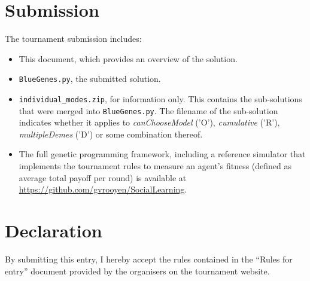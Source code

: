 \documentclass[a4paper,10pt]{article}
\begin{document}
\section{Submission}
The tournament submission includes:
\begin{itemize}
 \item This document, which provides an overview of the solution.
 \item \texttt{BlueGenes.py}, the submitted solution.
 \item \texttt{individual\_modes.zip}, for information only. This contains the sub-solutions that were merged into
   \texttt{BlueGenes.py}. The filename of the sub-solution indicates whether it applies to \emph{canChooseModel}
   ('O'), \emph{cumulative} ('R'), \emph{multipleDemes} ('D') or some combination thereof.
 \item The full genetic programming framework, including a reference simulator that implements the tournament
   rules to measure an agent's fitness (defined as average total payoff per round) is available at
   \href{https://github.com/gvrooyen/SocialLearning}{https://github.com/gvrooyen/SocialLearning}.
\end{itemize}


\section{Declaration}
By submitting this entry, I hereby accept the rules contained in the ``Rules for entry'' document provided by
the organisers on the tournament website.
\end{document}

